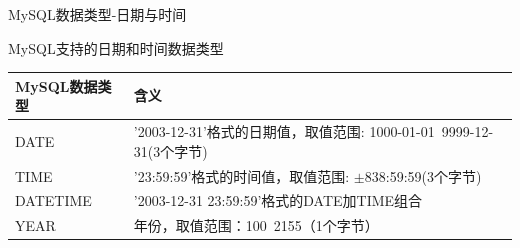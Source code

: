 \documentclass[CJK]{beamer}
\begin{document}
\begin{CJK*}{UTF8}{gbsn}
\begin{frame}{MySQL数据类型-日期与时间}
\begin{center}
{\small MySQL支持的日期和时间数据类型}
\end{center}
{\tiny
\begin{tabular}{l|p{8cm}}\hline
MySQL数据类型 & 含义 \\ \hline
DATE & '2003-12-31'格式的日期值，取值范围: 1000-01-01~9999-12-31(3个字节)\\ \hline
TIME & '23:59:59'格式的时间值，取值范围: $\pm$838:59:59(3个字节)\\ \hline
DATETIME & '2003-12-31 23:59:59'格式的DATE加TIME组合\\ \hline
YEAR & 年份，取值范围：100~2155（1个字节）\\ \hline
\end{tabular}}
\end{frame}


\end{CJK*}
\end{document}
